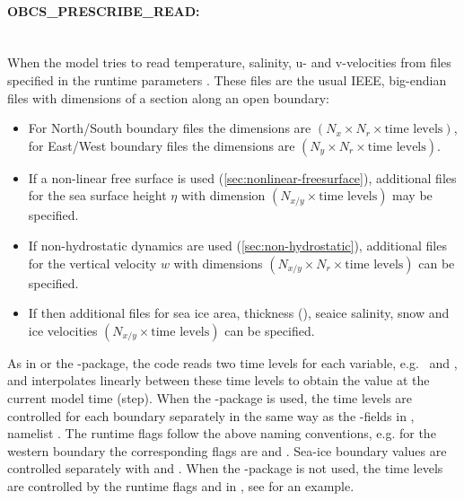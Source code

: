 \paragraph{OBCS\_PRESCRIBE\_READ:} ~ \\
%
When  the model tries to read
temperature, salinity, u- and v-velocities from files specified in the
runtime parameters . These files are
the usual IEEE, big-endian files with dimensions of a section along an
open boundary:
\begin{itemize}
\item For North/South boundary files the dimensions are
  $(N_x\times N_r\times\mbox{time levels})$, for East/West boundary
  files the dimensions are $(N_y\times N_r\times\mbox{time levels})$.
\item If a non-linear free surface is used
  (\ref{sec:nonlinear-freesurface}), additional files
   for the sea surface height $\eta$ with
  dimension $(N_{x/y}\times\mbox{time levels})$ may be specified.
\item If non-hydrostatic dynamics are used
  (\ref{sec:non-hydrostatic}), additional files
   for the vertical velocity $w$ with
  dimensions $(N_{x/y}\times N_r\times\mbox{time levels})$ can be
  specified.
\item If  then additional files
   for sea ice area, thickness
  (), seaice salinity, snow and ice velocities
  $(N_{x/y}\times\mbox{time levels})$ can be specified.
\end{itemize}
As in  or the -package, the
code reads two time levels for each variable, e.g.\  and
, and interpolates linearly between these time levels to
obtain the value  at the current model time (step). When the
-package is used, the time levels are controlled for each
boundary separately in the same way as the -fields in
, namelist . The runtime flags
follow the above naming conventions, e.g. for the western boundary the
corresponding flags are  and
. Sea-ice boundary values are controlled separately
with  and .  When the
-package is not used, the time levels are controlled by the
runtime flags  and 
in , see  for an example.

